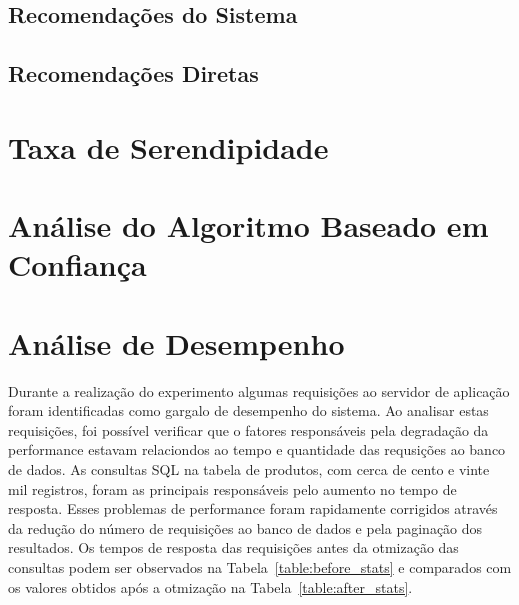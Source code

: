 \subsection{Recomendações do Sistema}

\subsection{Recomendações Diretas}


\section{Taxa de Serendipidade}
\label{sec:taxa_de_serendipidade}


\section{Análise do Algoritmo Baseado em Confiança}
\label{sec:analise_do_algoritmo_baseado_em_confianca}


\section{Análise de Desempenho}
\label{sec:analise_de_desempenho}

Durante a realização do experimento algumas requisições ao servidor de aplicação foram identificadas como gargalo de desempenho do sistema. Ao analisar estas requisições, foi possível verificar que o fatores responsáveis pela degradação da performance estavam relaciondos ao tempo e quantidade das requsições ao banco de dados. As consultas SQL na tabela de produtos, com cerca de cento e vinte mil registros, foram as principais responsáveis pelo aumento no tempo de resposta. Esses problemas de performance foram rapidamente corrigidos através da redução do número de requisições ao banco de dados e pela paginação dos resultados. Os tempos de resposta das requisições antes da otmização das consultas podem ser observados na Tabela~\ref{table:before_stats} e comparados com os valores obtidos após a otmização na Tabela~\ref{table:after_stats}.

